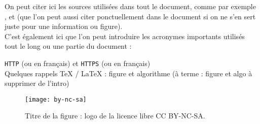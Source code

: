 \documentclass[a4paper,11pt]{article}
\begin{document}
On peut citer ici les sources utilisées dans tout le document, comme par exemple \cite{pixees}, et \cite{lewebpedagogique} (que l'on peut aussi citer ponctuellement dans le document si on ne s'en sert juste pour une information ou figure). %
\\ %

C'est également ici que l'on peut introduire les acronymes importants utilisés tout le long ou une partie du document :

{\tt HTTP} (\fg ou \fg en français) 
et {\tt HTTPS} (\fg ou \fg en français) 
\\

Quelques rappels TeX / LaTeX : figure et algorithme (à terme : figure et algo à supprimer de l'intro)
\begin{figure}[!h] %
\begin{center}
  \texttt{[image: by-nc-sa]} %
  \caption{Titre de la figure : logo de la licence libre CC BY-NC-SA.}
  \label{fig1}
\end{center}
\end{figure}
\end{document}
